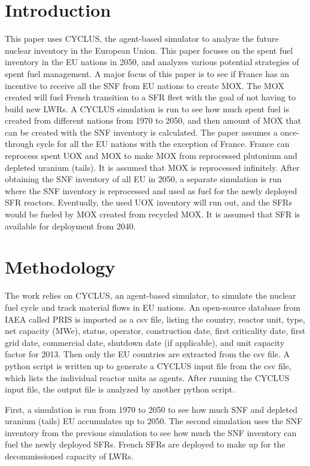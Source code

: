 \section{Introduction}
This paper uses CYCLUS, the agent-based simulator \cite{huff_fundamental_2016} to analyze
the future nuclear inventory in the European Union. This paper focuses on the spent fuel
inventory in the EU nations in 2050, and analyzes various potential strategies of spent fuel
management.
A major focus of this paper is to see if France has an incentive
to receive all the \gls{SNF} from EU nations to create \gls{MOX}.
The \gls{MOX} created will fuel French transition to a \gls{SFR} fleet
with the goal of not having to build new \gls{LWR}s.
A CYCLUS simulation is run to see
how much spent fuel is created from different nations from 1970 to 2050, and then amount
of \gls{MOX} that can be created with the \gls{SNF} inventory is calculated.
The paper assumes a once-through cycle for all the 
EU nations with the exception of France. France can reprocess spent \gls{UOX} and \gls{MOX} to
make \gls{MOX} from reprocessed plutonium and depleted uranium (tails). It is assumed that
\gls{MOX} is reprocessed infinitely. 
After obtaining the \gls{SNF} inventory of all EU in 2050, a separate
simulation is run where the \gls{SNF} inventory is reprocessed and
used as fuel for the newly deployed \gls{SFR} reactors. Eventually,
the used \gls{UOX} inventory will run out, and the \gls{SFR}s would be
fueled by \gls{MOX} created from recycled \gls{MOX}.
It is assumed that \gls{SFR} is available for deployment
from 2040. 


\section{Methodology}
The work relies on CYCLUS, an agent-based simulator, to simulate the nuclear fuel cycle
and track material flows in EU nations. An open-source database from \gls{IAEA} called
\gls{PRIS} is imported as a csv file, listing the country, reactor unit, type, net capacity (MWe), status,
operator, construction date, first criticality date, first grid date, commercial date, shutdown
date (if applicable), and unit capacity factor for 2013. Then only the EU countries are extracted
from the csv file. A python script is written up to generate a CYCLUS input file from the csv file,
which lists the individual reactor units as agents. After running the CYCLUS input file,
the output file is analyzed by another python script.

First, a simulation is run from 1970 to 2050 to see how much
\gls{SNF} and depleted uranium (tails) EU accumulates up to 2050. 
The second simulation uses the \gls{SNF} inventory from the previous
simulation to see how much the \gls{SNF} inventory can fuel
the newly deployed \gls{SFR}s. French \gls{SFR}s are deployed
to make up for the decommissioned capacity of \gls{LWR}s.


